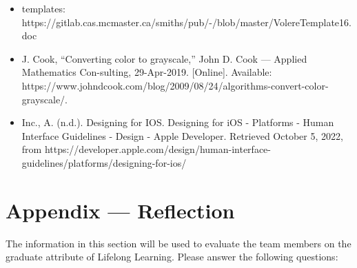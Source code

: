\documentclass[12pt]{article}
\begin{document}
\begin{itemize}
    \item templates: https://gitlab.cas.mcmaster.ca/smiths/pub/-/blob/master/VolereTemplate16.doc
    \item J. Cook, “Converting color to grayscale,” John D. Cook — Applied Mathematics Con-sulting, 29-Apr-2019. [Online]. Available: \newline https://www.johndcook.com/blog/2009/08/24/algorithms-convert-color-grayscale/.
    \item Inc., A. (n.d.). Designing for IOS. Designing for iOS - Platforms - Human Interface Guidelines - Design - Apple Developer. \newline Retrieved October 5, 2022, from https://developer.apple.com/design/human-interface-guidelines/platforms/designing-for-ios/ 
\end{itemize}

\section*{Appendix --- Reflection}

The information in this section will be used to evaluate the team members on the
graduate attribute of Lifelong Learning.  Please answer the following questions:
\end{document}
